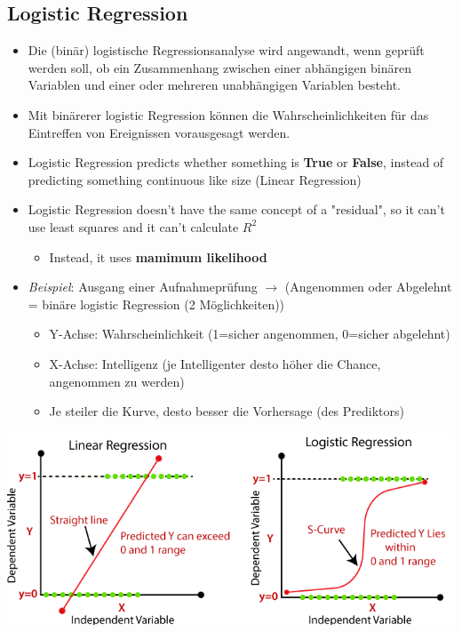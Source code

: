 \subsection{Logistic Regression}
\begin{itemize}
    \item Die (binär) logistische Regressionsanalyse wird angewandt, wenn geprüft werden soll, ob ein Zusammenhang zwischen einer abhängigen binären Variablen und einer oder mehreren unabhängigen Variablen besteht.
    \item Mit binärerer logistic Regression können die Wahrscheinlichkeiten für das Eintreffen von Ereignissen vorausgesagt werden.
    \item Logistic Regression predicts whether something is \textbf{True} or \textbf{False}, instead of predicting something continuous like size (Linear Regression)
    \item Logistic Regression doesn't have the same concept of a "residual", so it can't use least squares and it can't calculate $R^2$
    \begin{itemize}
        \item Instead, it uses \textbf{mamimum likelihood}
    \end{itemize}
    \item \textit{Beispiel}:  Ausgang einer Aufnahmeprüfung $\rightarrow$ (Angenommen oder Abgelehnt = binäre logistic Regression (2 Möglichkeiten))
    \begin{itemize}
        \item Y-Achse: Wahrscheinlichkeit (1=sicher angenommen, 0=sicher abgelehnt)
        \item X-Achse: Intelligenz (je Intelligenter desto höher die Chance, angenommen zu werden)
        \item Je steiler die Kurve, desto besser die Vorhersage (des Prediktors)
    \end{itemize}
\end{itemize}

\begin{center}
    \includegraphics[width=0.8\linewidth]{./img/logistic_regression.png}
\end{center}
